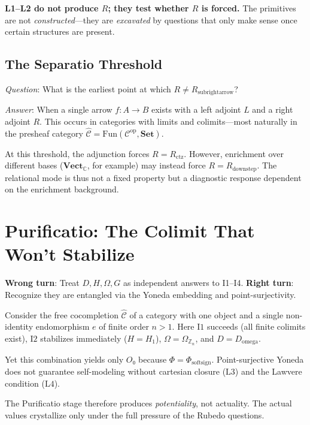 \documentclass[12pt,a4paper]{article}
\newcommand{\wrongturn}[1]{\textbf{\color{red!70!black}Wrong turn}: #1}
\newcommand{\rightturn}[1]{\textbf{\color{grimoiregold}Right turn}: #1}
\begin{document}
\textbf{L1--L2 do not produce $R$; they test whether $R$ is forced.} The primitives are not \emph{constructed}—they are \emph{excavated} by questions that only make sense once certain structures are present.

\subsection{The Separatio Threshold}

\emph{Question}: What is the earliest point at which $R \neq R_{\text{subrightarrow}}$?

\emph{Answer}: When a single arrow $f \colon A \to B$ exists with a left adjoint $L$ and a right adjoint $R$. This occurs in categories with limits and colimits—most naturally in the presheaf category $\widehat{\mathcal{C}} = \mathrm{Fun}(\mathcal{C}^{\mathrm{op}}, \mathbf{Set})$.

At this threshold, the adjunction forces $R = R_{\text{ctz}}$. However, enrichment over different bases ($\mathbf{Vect}_{\mathbb{C}}$, for example) may instead force $R = R_{\text{downstep}}$. The relational mode is thus not a fixed property but a diagnostic response dependent on the enrichment background.

\section{Purificatio: The Colimit That Won't Stabilize}

\wrongturn{Treat $D, H, \Omega, G$ as independent answers to I1--I4.} 
\rightturn{Recognize they are entangled via the Yoneda embedding and point-surjectivity.}

Consider the free cocompletion $\widehat{\mathcal{C}}$ of a category with one object and a single non-identity endomorphism $e$ of finite order $n > 1$. Here $\mathrm{I1}$ succeeds (all finite colimits exist), $\mathrm{I2}$ stabilizes immediately ($H = H_1$), $\Omega = \Omega_{\mathbb{Z}_n}$, and $D = D_{\text{omega}}$.

Yet this combination yields only $O₀$ because $\Phi = \Phi_{\text{softsign}}$. Point-surjective Yoneda does not guarantee self-modeling without cartesian closure ($\mathrm{L3}$) and the Lawvere condition ($\mathrm{L4}$).

The Purificatio stage therefore produces \emph{potentiality}, not actuality. The actual values crystallize only under the full pressure of the Rubedo questions.

\end{document}
